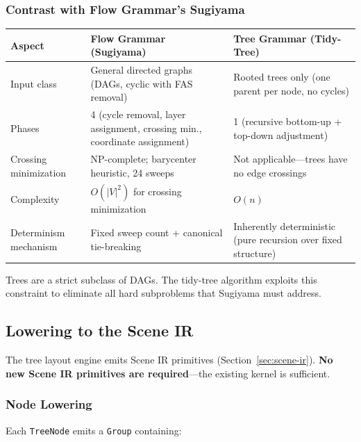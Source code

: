 \subsubsection{Contrast with Flow Grammar's Sugiyama}

\begin{center}
\small
\begin{tabular}{lp{5cm}p{5cm}}
\toprule
\textbf{Aspect} & \textbf{Flow Grammar (Sugiyama)} & \textbf{Tree Grammar (Tidy-Tree)} \\
\midrule
Input class & General directed graphs (DAGs, cyclic with FAS removal) & Rooted trees only (one parent per node, no cycles) \\
Phases & 4 (cycle removal, layer assignment, crossing min., coordinate assignment) & 1 (recursive bottom-up + top-down adjustment) \\
Crossing minimization & NP-complete; barycenter heuristic, 24 sweeps & Not applicable---trees have no edge crossings \\
Complexity & $O(|V|^2)$ for crossing minimization & $O(n)$ \\
Determinism mechanism & Fixed sweep count + canonical tie-breaking & Inherently deterministic (pure recursion over fixed structure) \\
\bottomrule
\end{tabular}
\end{center}

Trees are a strict subclass of DAGs. The tidy-tree algorithm exploits this constraint to eliminate all hard subproblems that Sugiyama must address.

\subsection{Lowering to the Scene IR}
\label{sec:tree-lowering}

The tree layout engine emits Scene IR primitives (Section~\ref{sec:scene-ir}). \textbf{No new Scene IR primitives are required}---the existing kernel is sufficient.

\subsubsection{Node Lowering}

Each \texttt{TreeNode} emits a \texttt{Group} containing:

